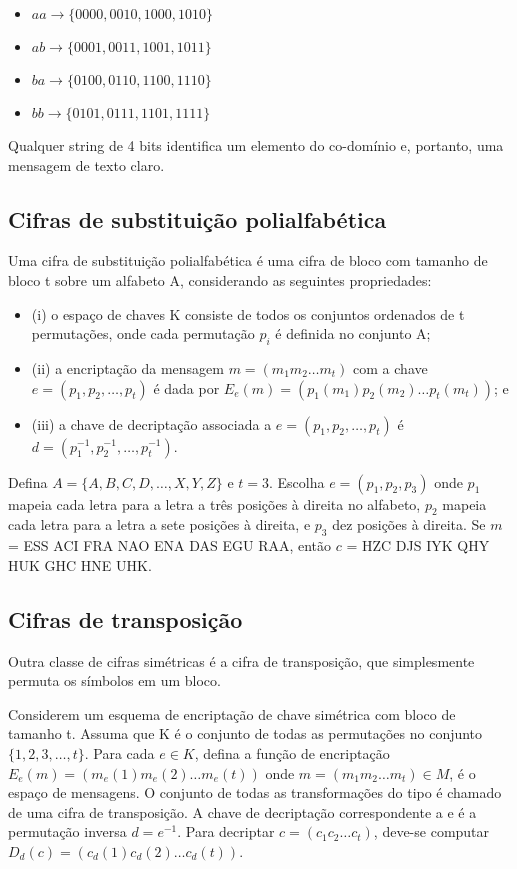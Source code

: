 \documentclass[
	10pt,				%
	openright,			%
	twoside,			%
	a5paper,			%
	english,			%
	french,				%
	spanish,			%
	brazil,				%
	sumario=tradicional
]{abntex2}
\begin{document}
\begin{itemize}[noitemsep]
\item $aa \to \{ 0000, 0010, 1000, 1010 \}$
\item $ab \to \{ 0001, 0011, 1001, 1011 \}$
\item $ba \to \{ 0100, 0110, 1100, 1110 \}$
\item $bb \to \{ 0101, 0111, 1101, 1111 \}$
\end{itemize}

Qualquer string de 4 bits identifica um elemento do co-domínio e, portanto, uma mensagem de texto claro.

\subsection{Cifras de substituição polialfabética}

Uma cifra de substituição polialfabética é uma cifra de bloco com tamanho de bloco t sobre um alfabeto A, considerando as seguintes propriedades:

\begin{itemize}[noitemsep]
\item (i) o espaço de chaves K consiste de todos os conjuntos ordenados de t permutações, onde cada permutação $p_i$ é definida no conjunto A;
\item (ii) a encriptação da mensagem $m = (m_1 m_2 \ldots m_t)$ com a chave $e = (p_1, p_2, \ldots,  p_t)$ é dada por $E_e (m) = (p_1 (m_1)p_2 (m_2) \ldots p_t (m_t))$; e
\item (iii) a chave de decriptação associada a $e = (p_1, p_2, …, p_t)$ é $d = (p_1^{-1}, p_2^{-1}, \ldots,  p_t^{-1})$.
\end{itemize}

Defina $A = \{A, B, C, D, \ldots, X, Y, Z\}$ e $t = 3$. Escolha $e = (p_1, p_2, p_3)$ onde $p_1$ mapeia cada letra para a letra a três posições à direita no alfabeto, $p_2$ mapeia cada letra para a letra a sete posições à direita, e $p_3$ dez posições à direita. Se $m$ = ESS ACI FRA NAO ENA DAS EGU RAA, então $c$ = HZC DJS IYK QHY HUK GHC HNE UHK.

\subsection{Cifras de transposição}

Outra classe de cifras simétricas é a cifra de transposição, que simplesmente permuta os símbolos em um bloco.

Considerem um esquema de encriptação de chave simétrica com bloco de tamanho t. Assuma que K é o conjunto de todas as permutações no conjunto $\{1, 2, 3, \ldots, t\}$. Para cada $e \in K$, defina a função de encriptação $E_e (m) = (m_e(1) m_e(2) \ldots m_e(t))$ onde $m = (m_1 m_2 \ldots m_t) \in M$, é o espaço de mensagens. O conjunto de todas as transformações do tipo é chamado de uma cifra de transposição. A chave de decriptação correspondente a e é a permutação inversa $d = e^{-1}$. Para decriptar $c = (c_1 c_2 \ldots c_t)$, deve-se computar $D_d(c) = (c_d(1) c_d(2) \ldots c_d(t))$.
\end{document}
